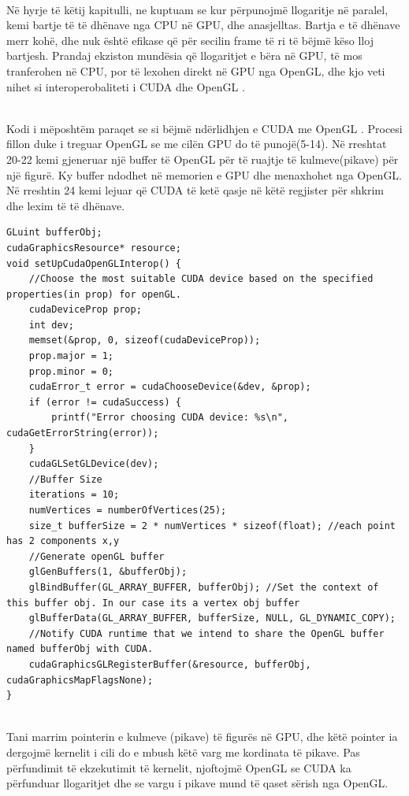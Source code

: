 \noindent \\ Në hyrje të këtij kapitulli, ne kuptuam se kur përpunojmë llogaritje në paralel, kemi bartje të të dhënave nga CPU në GPU, dhe anasjelltas. Bartja e të dhënave merr kohë, dhe nuk është efikase që për secilin frame të ri të bëjmë këso lloj bartjesh. Prandaj ekziston mundësia  që llogaritjet e bëra në GPU, të mos tranferohen në CPU, por të lexohen direkt në GPU nga OpenGL, dhe kjo veti nihet si interoperobaliteti i CUDA dhe OpenGL \cite{cuda_guide}. 

\noindent \\ Kodi i mëposhtëm paraqet se si bëjmë ndërlidhjen e CUDA me OpenGL \cite{cuda_by_example}. Procesi fillon duke i treguar OpenGL se me cilën GPU do të punojë(5-14).  Në rreshtat 20-22 kemi gjeneruar një buffer të OpenGL për të ruajtje të kulmeve(pikave) për një figurë. Ky buffer ndodhet në memorien e GPU dhe menaxhohet nga OpenGL.  Në rreshtin 24 kemi lejuar që  CUDA të ketë qasje në këtë regjister për shkrim dhe lexim të të dhënave.\\

\begin{lstlisting}
GLuint bufferObj;
cudaGraphicsResource* resource;
void setUpCudaOpenGLInterop() {
    //Choose the most suitable CUDA device based on the specified properties(in prop) for openGL.
    cudaDeviceProp prop;
    int dev;
    memset(&prop, 0, sizeof(cudaDeviceProp));
    prop.major = 1;
    prop.minor = 0;
    cudaError_t error = cudaChooseDevice(&dev, &prop);
    if (error != cudaSuccess) {
        printf("Error choosing CUDA device: %s\n", cudaGetErrorString(error));
    }
    cudaGLSetGLDevice(dev);
    //Buffer Size
    iterations = 10;
    numVertices = numberOfVertices(25);
    size_t bufferSize = 2 * numVertices * sizeof(float); //each point has 2 components x,y 
    //Generate openGL buffer
    glGenBuffers(1, &bufferObj);
    glBindBuffer(GL_ARRAY_BUFFER, bufferObj); //Set the context of this buffer obj. In our case its a vertex obj buffer
    glBufferData(GL_ARRAY_BUFFER, bufferSize, NULL, GL_DYNAMIC_COPY); 
    //Notify CUDA runtime that we intend to share the OpenGL buffer named bufferObj with CUDA.
    cudaGraphicsGLRegisterBuffer(&resource, bufferObj, cudaGraphicsMapFlagsNone);
}

\end{lstlisting}

\noindent \\ Tani marrim pointerin e  kulmeve (pikave) të figurës në GPU, dhe këtë pointer ia dergojmë kernelit i cili do e mbush këtë varg me kordinata të pikave. Pas përfundimit të ekzekutimit të kernelit,  njoftojmë OpenGL se CUDA ka përfunduar llogaritjet dhe se vargu i pikave mund të qaset sërish nga OpenGL.\\

